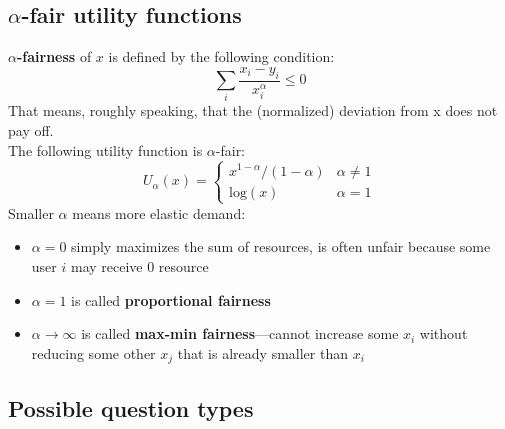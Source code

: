 \documentclass{article}
\newcommand{\MatrixVariable}[1]{\bm{\mathit{#1}}}
\begin{document}
\subsection{$\alpha$-fair utility functions}

\textbf{$\alpha$-fairness} of $\MatrixVariable{x}$ is defined by the following condition:
$$ \sum_i \frac{x_i - y_i}{x_i^\alpha} \leq 0 $$
That means, roughly speaking, that the (normalized) deviation from x does not pay off. \\
The following utility function is $\alpha$-fair:
$$ U_\alpha(x) = \begin{cases} x^{1-\alpha}/(1-\alpha) & \alpha \neq 1 \\ \text{log}(x) & \alpha = 1 \end{cases} $$
Smaller $\alpha$ means more elastic demand:
\begin{itemize}
\item $\alpha = 0$ simply maximizes the sum of resources, is often unfair because some user $i$ may receive 0 resource
\item $\alpha = 1$ is called \textbf{proportional fairness}
\item $\alpha \to \infty$ is called \textbf{max-min fairness}---cannot increase some $x_i$ without reducing some other $x_j$ that is already smaller than $x_i$
\end{itemize}

\subsection{Possible question types}
\end{document}
